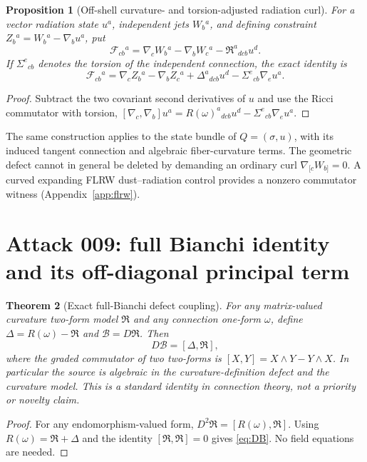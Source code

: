 \documentclass[11pt,a4paper]{article}
\newtheorem{theorem}{Theorem}[section]
\newtheorem{proposition}[theorem]{Proposition}
\newcommand{\cB}{\mathcal B}
\newcommand{\cF}{\mathcal F}
\begin{document}
\begin{proposition}[Off-shell curvature- and torsion-adjusted radiation curl]\label{prop:jetcurl}
For a vector radiation state $u^a$, independent jets $W_b{}^a$, and defining constraint $Z_b{}^a=W_b{}^a-\nabla_bu^a$, put
\[\cF_{cb}{}^a=\nabla_cW_b{}^a-\nabla_bW_c{}^a-
\mathfrak R^a{}_{dcb}u^d.\]
If $\Sigma^e{}_{cb}$ denotes the torsion of the independent connection, the exact identity is
\begin{equation}\label{eq:torsioncurl}
\boxed{\cF_{cb}{}^a=
\nabla_cZ_b{}^a-\nabla_bZ_c{}^a+
\Delta^a{}_{dcb}u^d-\Sigma^e{}_{cb}\nabla_eu^a.}
\end{equation}
\end{proposition}
\begin{proof}Subtract the two covariant second derivatives of $u$ and use the Ricci commutator with torsion,
$[\nabla_c,\nabla_b]u^a=R(\omega)^a{}_{dcb}u^d-\Sigma^e{}_{cb}\nabla_eu^a$.\end{proof}
The same construction applies to the state bundle of $Q=(\sigma,u)$, with its induced tangent connection and algebraic fiber-curvature terms. The geometric defect cannot in general be deleted by demanding an ordinary curl $\nabla_{[c}W_{b]}=0$. A curved expanding FLRW dust--radiation control provides a nonzero commutator witness (Appendix~\ref{app:flrw}).

\section{Attack 009: full Bianchi identity and its off-diagonal principal term}
\begin{theorem}[Exact full-Bianchi defect coupling]\label{thm:fullB}
For any matrix-valued curvature two-form model $\mathfrak R$ and any connection one-form $\omega$, define $\Delta=R(\omega)-\mathfrak R$ and $\cB=D\mathfrak R$. Then
\begin{equation}\label{eq:DB}
\boxed{D\cB=[\Delta,\mathfrak R],}
\end{equation}
where the graded commutator of two two-forms is $[X,Y]=X\wedge Y-Y\wedge X$. In particular the source is algebraic in the curvature-definition defect and the curvature model. This is a standard identity in connection theory, not a priority or novelty claim.
\end{theorem}
\begin{proof}For any endomorphism-valued form, $D^2\mathfrak R=[R(\omega),\mathfrak R]$. Using $R(\omega)=\mathfrak R+\Delta$ and the identity $[\mathfrak R,\mathfrak R]=0$ gives \eqref{eq:DB}. No field equations are needed.\end{proof}
\end{document}

